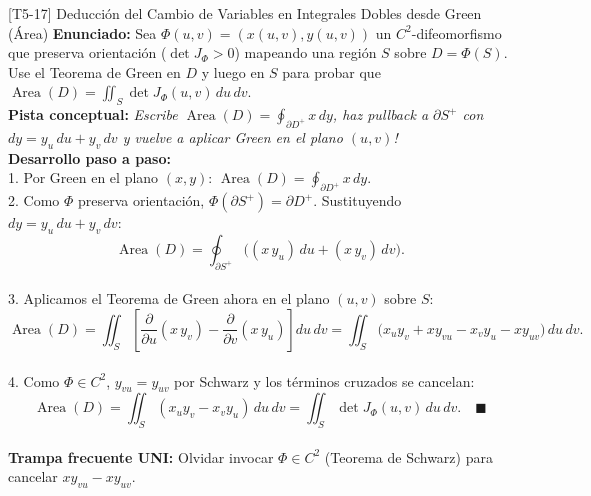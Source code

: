 \documentclass[11pt,a4paper]{article}
\begin{document}
\begin{ejerciciobox}{[T5-17] Deducción del Cambio de Variables en Integrales Dobles desde Green (Área)}
\textbf{Enunciado:} Sea $\Phi(u,v) = (x(u,v), y(u,v))$ un $C^2$-difeomorfismo que preserva orientación ($\det J_\Phi > 0$) mapeando una región $S$ sobre $D = \Phi(S)$. Use el Teorema de Green en $D$ y luego en $S$ para probar que $\operatorname{Area}(D) = \iint_S \det J_\Phi(u,v)\,du\,dv$.\\[0.2cm]
\textbf{Pista conceptual:} \emph{Escribe $\operatorname{Area}(D) = \oint_{\partial D^+} x\,dy$, haz pullback a $\partial S^+$ con $dy = y_u\,du + y_v\,dv$ y vuelve a aplicar Green en el plano $(u,v)$!}\\[0.2cm]
\textbf{Desarrollo paso a paso:}\\
1. Por Green en el plano $(x,y)$: $\operatorname{Area}(D) = \oint_{\partial D^+} x\,dy$.\\
2. Como $\Phi$ preserva orientación, $\Phi(\partial S^+) = \partial D^+$. Sustituyendo $dy = y_u\,du + y_v\,dv$:\\
$$\operatorname{Area}(D) = \oint_{\partial S^+} \big( (x\,y_u)\,du + (x\,y_v)\,dv \big).$$\\
3. Aplicamos el Teorema de Green ahora en el plano $(u,v)$ sobre $S$:\\
$$\operatorname{Area}(D) = \iint_S \left[ \frac{\partial}{\partial u}(x\,y_v) - \frac{\partial}{\partial v}(x\,y_u) \right] du\,dv = \iint_S \big( x_u y_v + x y_{vu} - x_v y_u - x y_{uv} \big)\,du\,dv.$$\\
4. Como $\Phi \in C^2$, $y_{vu} = y_{uv}$ por Schwarz y los términos cruzados se cancelan:\\
$$\operatorname{Area}(D) = \iint_S (x_u y_v - x_v y_u)\,du\,dv = \iint_S \det J_\Phi(u,v)\,du\,dv. \quad \blacksquare$$\\[0.2cm]
\textbf{Trampa frecuente UNI:} Olvidar invocar $\Phi \in C^2$ (Teorema de Schwarz) para cancelar $x y_{vu} - x y_{uv}$.
\end{ejerciciobox}
\end{document}
